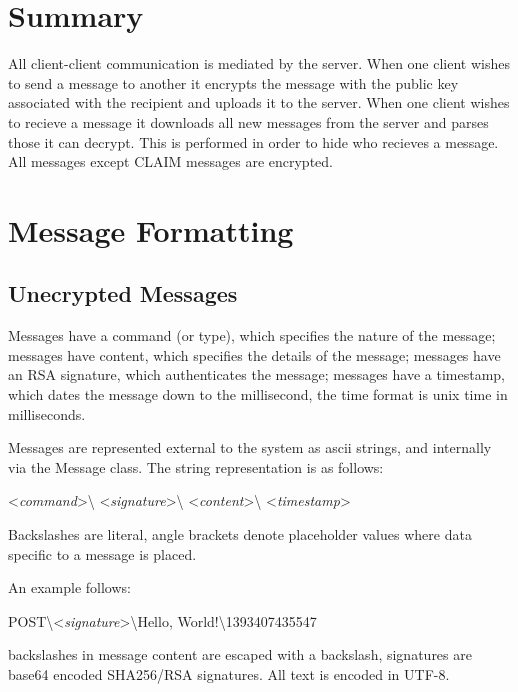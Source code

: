 \section{Summary}
All client-client communication is mediated by the server. When one client
wishes to send a message to another it encrypts the message with the public key
associated with the recipient and uploads it to the server. When one client
wishes to recieve a message it downloads all new messages from the server and
parses those it can decrypt. This is performed in order to hide who recieves a
message. All messages except CLAIM messages are encrypted.

\section{Message Formatting}
\subsection{Unecrypted Messages}
Messages have a command (or type), which specifies the nature of the message;
messages have content, which specifies the details of the message;
messages have an RSA signature, which authenticates the message;
messages have a timestamp, which dates the message down to the millisecond, the
time format is unix time in milliseconds.

Messages are represented external to the system as ascii strings, and internally
via the Message class. The string representation is as follows:\\

\begin{center}
\textless \textit{command}\textgreater\textbackslash
\textless \textit{signature}\textgreater\textbackslash
\textless \textit{content}\textgreater\textbackslash
\textless \textit{timestamp}\textgreater
\end{center}

Backslashes are literal, angle brackets denote placeholder values where data
specific to a message is placed.

An example follows:
\begin{center}
POST\textbackslash\textless\textit{signature}\textgreater\textbackslash Hello, World!\textbackslash 1393407435547
\end{center}

backslashes in message content are escaped with a backslash, signatures are
base64 encoded SHA256/RSA signatures. All text is encoded in UTF-8.

